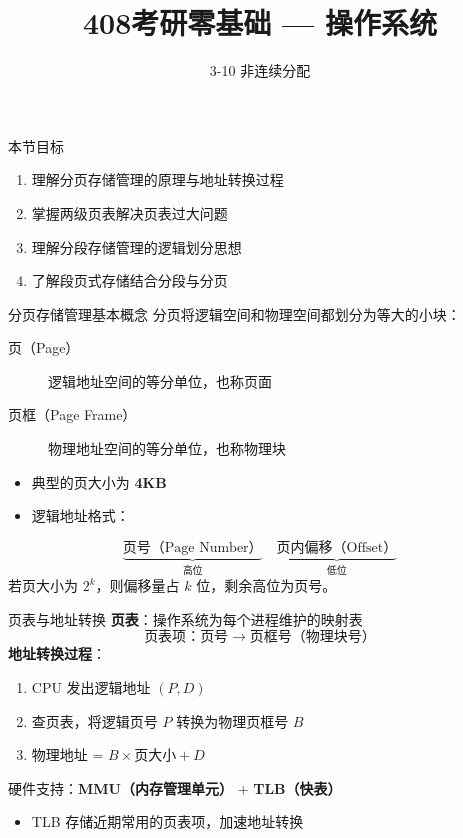 \documentclass[10pt, aspectratio=169]{beamer}
\title{408考研零基础 --- 操作系统}
\subtitle{3-10 非连续分配}
\author{}
\date{}
\begin{document}
\begin{frame}{本节目标}
    \begin{enumerate}
        \item 理解分页存储管理的原理与地址转换过程
        \item 掌握两级页表解决页表过大问题
        \item 理解分段存储管理的逻辑划分思想
        \item 了解段页式存储结合分段与分页
    \end{enumerate}
\end{frame}

\begin{frame}{分页存储管理基本概念}
    分页将逻辑空间和物理空间都划分为等大的小块：
    \begin{description}
        \item[页（Page）] 逻辑地址空间的等分单位，也称页面
        \item[页框（Page Frame）] 物理地址空间的等分单位，也称物理块
    \end{description}
    \vspace{0.5em}
    \begin{itemize}
        \item 典型的页大小为 \textbf{4KB}
        \item 逻辑地址格式：
    \end{itemize}
    \[
    \underbrace{\text{页号（Page Number）}}_{\text{高位}} \quad
    \underbrace{\text{页内偏移（Offset）}}_{\text{低位}}
    \]
    若页大小为 $2^k$，则偏移量占 $k$ 位，剩余高位为页号。
\end{frame}

\begin{frame}{页表与地址转换}
    \textbf{页表}：操作系统为每个进程维护的映射表
    \[
    \text{页表项}：\text{页号} \rightarrow \text{页框号（物理块号）}
    \]
    \vspace{0.5em}
    \textbf{地址转换过程}：
    \begin{enumerate}
        \item CPU 发出逻辑地址 $(P, D)$
        \item 查页表，将逻辑页号 $P$ 转换为物理页框号 $B$
        \item 物理地址 = $B \times \text{页大小} + D$
    \end{enumerate}
    \vspace{0.5em}
    硬件支持：\textbf{MMU（内存管理单元）} + \textbf{TLB（快表）}
    \begin{itemize}
        \item TLB 存储近期常用的页表项，加速地址转换
    \end{itemize}
\end{frame}
\end{document}
